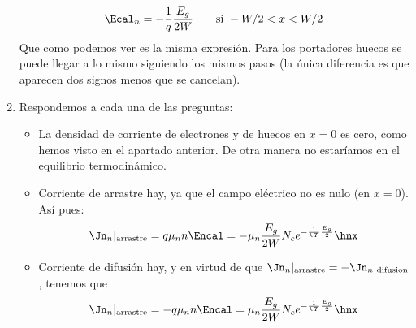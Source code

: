 \begin{enumerate}[label=\alph*)]
		\begin{equation}
			\Ecal_n = - \frac{1}{q} \frac{E_g}{2W}   \qquad \text{si} \ - W/2<x<W/2
		\end{equation}
		Que como podemos ver es la misma expresión. Para los portadores huecos se puede llegar a lo mismo siguiendo los mismos pasos (la única diferencia es que aparecen dos signos menos que se cancelan).
		\item Respondemos a cada una de las preguntas:
		\begin{itemize}
			\item La densidad de corriente de electrones y de huecos en $x=0$ es cero, como hemos visto en el apartado anterior. De otra manera no estaríamos en el equilibrio termodinámico.
			\item Corriente de arrastre hay, ya que el campo eléctrico no es nulo (en $x=0$). Así pues:
			\begin{equation}
				\Jn_n |_{\text{arrastre}} = q \mu_n n \Encal =  - \mu_n \frac{E_g}{2W} N_c  e^{-\frac{1}{kT}\frac{E_g}{2}}  \hnx
			\end{equation}
			\item Corriente de difusión hay, y en virtud de que $\Jn_n|_{\text{arrastre}}=- \Jn_n|_{\text{difusion}}$, tenemos que
			\begin{equation}
				\Jn_n |_{\text{arrastre}} = - q \mu_n n \Encal =  \mu_n \frac{E_g}{2W} N_c  e^{-\frac{1}{kT}\frac{E_g}{2}}  \hnx
			\end{equation}
		\end{itemize}
	\end{enumerate}
